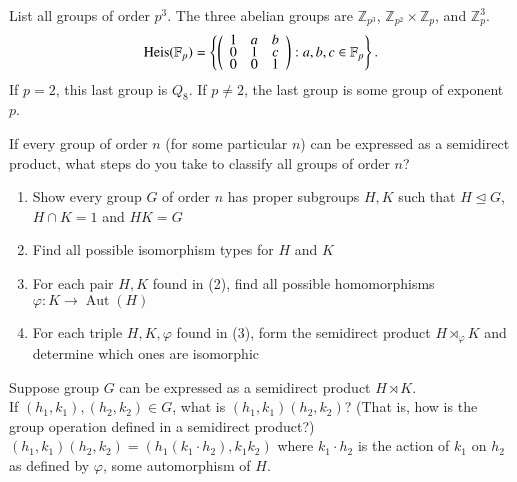 \documentclass[avery5371,grid]{flashcards}
\newcommand{\Z}{\mathbb{Z}}
\newcommand{\F}{\mathbb{F}}
\DeclareMathOperator{\Aut}{Aut}
\DeclareMathOperator{\Heis}{Heis}
\let \phi \varphi
\begin{document}
\begin{flashcard}[Groups]{List all groups of order $p^3$.}
 The three abelian groups are $\Z_{p^3}$, $\Z_{p^2} \times \Z_p$, and $\Z_p^3$.\\
 
 $$\Heis(\F_p) = \left \{ \left ( {\def\arraystretch{.5} \begin{array}{ccc}
1 & a & b \\
0 & 1 & c \\
0 & 0 & 1                                                                                                                                                                             \end{array} } \right ) : a,b,c \in \F_p \right \}.$$
\vspace{5pt}
If $p=2$, this last group is $Q_8$. If $p \neq 2$, the last group is some group of exponent $p$.
\end{flashcard}

\begin{flashcard}[Groups]{If every group of order $n$ (for some particular $n$) can be expressed as a semidirect product, what steps do you take to classify all groups of order $n$?}
 \begin{enumerate}
      \item Show every group $G$ of order $n$ has proper subgroups $H,K$ such that $H \trianglelefteq G$, $H \cap K = 1$ and $HK = G$
      \item Find all possible isomorphism types for $H$ and $K$
      \item For each pair $H,K$ found in (2), find all possible homomorphisms $\phi: K \to \Aut(H)$
      \item For each triple $H,K,\phi$ found in (3), form the semidirect product $H \rtimes_{\phi} K$ and determine which ones are isomorphic
 \end{enumerate}
\end{flashcard}

\begin{flashcard}[Groups]{Suppose group $G$ can be expressed as a semidirect product $H \rtimes K$. \\ If $(h_1, k_1), (h_2, k_2) \in G$, what is $(h_1, k_1)(h_2, k_2)$? (That is, how is the group operation defined in a semidirect product?)}
 $(h_1, k_1)(h_2, k_2) = (h_1 (k_1 \cdot h_2), k_1 k_2)$ where $k_1 \cdot h_2$ is the action of $k_1$ on $h_2$ as defined by $\phi$, some automorphism of $H$.
\end{flashcard}
\end{document}
